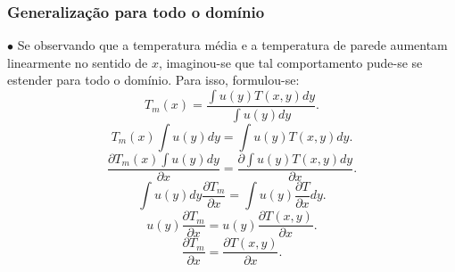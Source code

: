 \documentclass[xcolor=dvipsnames,10pt,aspectratio=169]{beamer}
\begin{document}
	
	
	
		
		\begin{frame}
		\frametitle{Generalização para todo o domínio}
		$\bullet$ Se observando que a temperatura média e a temperatura de parede aumentam linearmente no sentido de $ x $, imaginou-se que tal comportamento pude-se se estender para todo o domínio. Para isso, formulou-se:
		\begin{equation}
		T_m(x) = \frac{\int u(y) T(x , y) dy}{\int u(y)  dy} .
		\end{equation}
		\begin{equation}
		T_m(x) \int u(y)dy = \int u(y) T(x , y) dy .
		\end{equation}
		\begin{equation}
		\frac{\partial T_m(x) \int u(y)dy}{\partial x} = \frac{ \partial \int u(y) T(x , y) dy}{
		\partial x} .
		\end{equation}
		\begin{equation}
		 \int u(y)dy \frac{\partial T_m}{\partial x} = \int u(y)  \frac{\partial T}{
			\partial x}  dy.
		\end{equation}
		\begin{equation}
		u(y) \frac{\partial T_m}{\partial x} = u(y)  \frac{\partial T(x , y)}{
			\partial x}.
		\end{equation}
		\begin{equation}
		\frac{\partial T_m}{\partial x} = \frac{\partial T(x , y)}{
			\partial x}.
		\end{equation}		
		
		\end{frame}
		
\end{document}
